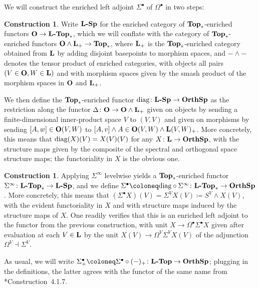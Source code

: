 \documentclass[reqno]{memo-l}
\theoremstyle{mythm}
\theoremstyle{definition}
\newtheorem{constr}[thm]{Construction}
\numberwithin{equation}{section}
\newcommand{\cat}[1]{\textbf{\textup{#1}}}
\newcommand{\diag}{\textup{diag}}
\let\smashp=\wedge
\newcommand{\osp}{{\textbf{\textup{OrthSp}}}}
\begin{document}
We will construct the enriched left adjoint $\Sigma^\bullet$ of $\Omega^\bullet$ in two steps:

\begin{constr}\label{constr:diag}
    Write $\cat{$\cat L$-Sp}$ for the enriched category of $\cat{Top}_*$-enriched functors $\cat{O}\to\cat{$\cat{L}$-Top}_*$, which we will conflate with the category of $\cat{Top}_*$-enriched functors $\cat{O}\smashp\cat{L}_+\to\cat{Top}_*$, where $\cat{L}_+$ is the $\cat{Top}_*$-enriched category obtained from $\cat{L}$ by adding disjoint basepoints to morphism spaces, and ${-}\smashp{-}$ denotes the tensor product of enriched categories, with objects all pairs $(V\in\cat{O},W\in\cat{L})$ and with morphism spaces given by the smash product of the morphism spaces in $\cat{O}$ and $\cat{L}_+$.

    We then define the $\cat{Top}_*$-enriched functor $\diag\colon\cat{$\cat{L}$-Sp}\to\osp$ as the restriction along the functor $\Delta\colon\cat{O}\to\cat{O}\smashp\cat{L}_+$ given on objects by sending a finite-dimensional inner-product space $V$ to $(V,V)$ and given on morphisms by sending $[A,w]\in\cat{O}(V,W)$ to $[A,v]\smashp A\in\cat{O}(V,W)\smashp\cat{L}(V,W)_+$. More concretely, this means that $\diag(X)(V)=X(V)(V)$ for any $X\colon\cat{L}\to\osp$, with the structure maps given by the composite of the spectral and orthogonal space structure maps; the functoriality in $X$ is the obvious one.
\end{constr}

\begin{constr}\label{constr:Sigma-bullet}
    Applying $\Sigma^\infty$ levelwise yields a $\cat{Top}_*$-enriched functor $\Sigma^\infty\colon\cat{$\cat{L}$-Top}_*\to\cat{$\cat{L}$-Sp}$, and we define $\Sigma^\bullet\coloneq\diag\circ\Sigma^\infty\colon\cat{\cat{L}-Top}_*\to\osp$. More concretely, this means that $(\Sigma^\bullet X)(V)=\Sigma^VX(V)\coloneqq S^V\smashp X(V)$, with the evident functoriality in $X$ and with structure maps induced by the structure maps of $X$. One readily verifies that this is an enriched left adjoint to the functor from the previous construction, with unit $X\to\Omega^\bullet\Sigma^\bullet X$ given after evaluation at each $V\in\cat{L}$ by the unit $X(V)\to\Omega^V\Sigma^VX(V)$ of the adjunction $\Omega^V\dashv\Sigma^V$.    
    
    As usual, we will write $\Sigma^\bullet_+\coloneq\Sigma^\bullet\circ(-)_+\colon\cat{$\cat{L}$-Top}\to\osp$; plugging in the definitions, the latter agrees with the functor of the same name from \cite{schwede2018global}*{Construction~4.1.7}.  
\end{constr}
\end{document}
